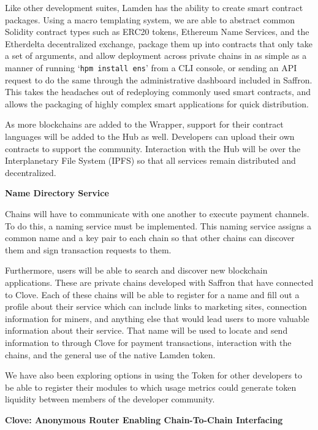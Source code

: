 \documentclass{%
	article}
\begin{document}
Like other development suites, Lamden has the ability to create smart contract packages. Using a macro templating system, we are able to abstract common Solidity contract types such as ERC20 tokens, Ethereum Name Services, and the Etherdelta decentralized exchange, package them up into contracts that only take a set of arguments, and allow deployment across private chains in as simple as a manner of running ‘\texttt{hpm install ens}’ from a CLI console, or sending an API request to do the same through the administrative dashboard included in Saffron. This takes the headaches out of redeploying commonly used smart contracts, and allows the packaging of highly complex smart applications for quick distribution.

As more blockchains are added to the Wrapper, support for their contract languages will be added to the Hub as well. Developers can upload their own contracts to support the community. Interaction with the Hub will be over the Interplanetary File System (IPFS) so that all services remain distributed and decentralized.

\begin{center}
\textbf{Name Directory Service}
\end{center}

Chains will have to communicate with one another to execute payment channels. To do this, a naming service must be implemented. This naming service assigns a common name and a key pair to each chain so that other chains can discover them and sign transaction requests to them.

Furthermore, users will be able to search and discover new blockchain applications. These are private chains developed with Saffron that have connected to Clove. Each of these chains will be able to register for a name and fill out a profile about their service which can include links to marketing sites, connection information for miners, and anything else that would lead users to more valuable information about their service. That name will be used to locate and send information to through Clove for payment transactions, interaction with the chains, and the general use of the native Lamden token.

We have also been exploring options in using the Token for other developers to be able to register their modules to which usage metrics could generate token liquidity between members of the developer community.

\begin{center}
\textbf{Clove: Anonymous Router Enabling Chain-To-Chain Interfacing}
\end{center}
\end{document}
